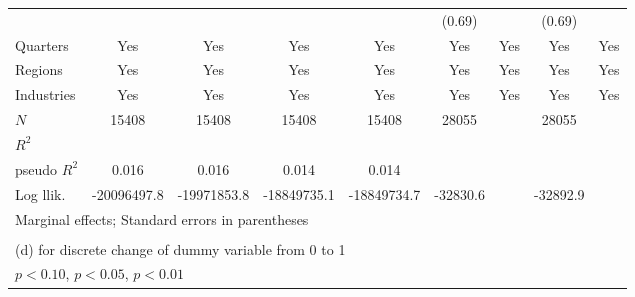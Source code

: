 {\begin{tabular}{l*{8}{c}}
               &                 &                 &                 &                 &  (0.69)         &                 &  (0.69)         &                 \\
Quarters       &     Yes         &     Yes         &     Yes         &     Yes         &     Yes         &     Yes         &     Yes         &     Yes         \\
Regions        &     Yes         &     Yes         &     Yes         &     Yes         &     Yes         &     Yes         &     Yes         &     Yes         \\
Industries     &     Yes         &     Yes         &     Yes         &     Yes         &     Yes         &     Yes         &     Yes         &     Yes         \\
\hline
\(N\)          &   15408         &   15408         &   15408         &   15408         &   28055         &                 &   28055         &                 \\
\(R^{2}\)      &                 &                 &                 &                 &                 &                 &                 &                 \\
pseudo \(R^{2}\)&   0.016         &   0.016         &   0.014         &   0.014         &                 &                 &                 &                 \\
Log llik.      &-20096497.8         &-19971853.8         &-18849735.1         &-18849734.7         &-32830.6         &                 &-32892.9         &                 \\
\hline\hline
\multicolumn{9}{l}{\footnotesize Marginal effects; Standard errors in parentheses}\\
\multicolumn{9}{l}{\footnotesize }\\
\multicolumn{9}{l}{\footnotesize  (d) for discrete change of dummy variable from 0 to 1}\\
\multicolumn{9}{l}{\footnotesize \sym{*} \(p<0.10\), \sym{**} \(p<0.05\), \sym{***} \(p<0.01\)}\\
\end{tabular}
}

